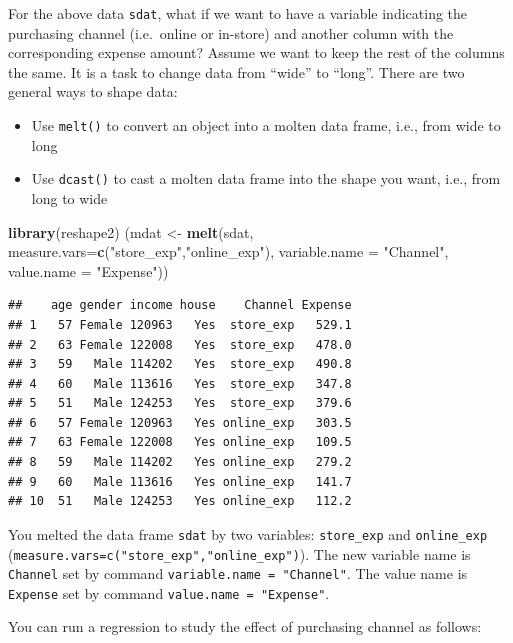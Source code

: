 \documentclass[12pt,]{krantz}
\newenvironment{Shaded}{\begin{snugshade}}{\end{snugshade}}
\newcommand{\KeywordTok}[1]{\textcolor[rgb]{0.13,0.29,0.53}{\textbf{{#1}}}}
\newcommand{\DataTypeTok}[1]{\textcolor[rgb]{0.13,0.29,0.53}{{#1}}}
\newcommand{\StringTok}[1]{\textcolor[rgb]{0.31,0.60,0.02}{{#1}}}
\newcommand{\NormalTok}[1]{{#1}}
\providecommand{\tightlist}{%
  \setlength{\itemsep}{0pt}\setlength{\parskip}{0pt}}
\theoremstyle{definition}
\theoremstyle{definition}
\theoremstyle{remark}
\begin{document}
For the above data \texttt{sdat}, what if we want to have a variable
indicating the purchasing channel (i.e.~online or in-store) and another
column with the corresponding expense amount? Assume we want to keep the
rest of the columns the same. It is a task to change data from ``wide''
to ``long''. There are two general ways to shape data:

\begin{itemize}
\tightlist
\item
  Use \texttt{melt()} to convert an object into a molten data frame,
  i.e., from wide to long
\item
  Use \texttt{dcast()} to cast a molten data frame into the shape you
  want, i.e., from long to wide
\end{itemize}

\begin{Shaded}
\begin{Highlighting}[]
\KeywordTok{library}\NormalTok{(reshape2)}
\NormalTok{(mdat <-}\StringTok{ }\KeywordTok{melt}\NormalTok{(sdat, }\DataTypeTok{measure.vars=}\KeywordTok{c}\NormalTok{(}\StringTok{"store_exp"}\NormalTok{,}\StringTok{"online_exp"}\NormalTok{),}
              \DataTypeTok{variable.name =} \StringTok{"Channel"}\NormalTok{,}
              \DataTypeTok{value.name =} \StringTok{"Expense"}\NormalTok{))}
\end{Highlighting}
\end{Shaded}

\begin{verbatim}
##    age gender income house    Channel Expense
## 1   57 Female 120963   Yes  store_exp   529.1
## 2   63 Female 122008   Yes  store_exp   478.0
## 3   59   Male 114202   Yes  store_exp   490.8
## 4   60   Male 113616   Yes  store_exp   347.8
## 5   51   Male 124253   Yes  store_exp   379.6
## 6   57 Female 120963   Yes online_exp   303.5
## 7   63 Female 122008   Yes online_exp   109.5
## 8   59   Male 114202   Yes online_exp   279.2
## 9   60   Male 113616   Yes online_exp   141.7
## 10  51   Male 124253   Yes online_exp   112.2
\end{verbatim}

You melted the data frame \texttt{sdat} by two variables:
\texttt{store\_exp} and \texttt{online\_exp}
(\texttt{measure.vars=c("store\_exp","online\_exp")}). The new variable
name is \texttt{Channel} set by command
\texttt{variable.name\ =\ "Channel"}. The value name is \texttt{Expense}
set by command \texttt{value.name\ =\ "Expense"}.

You can run a regression to study the effect of purchasing channel as
follows:
\end{document}
